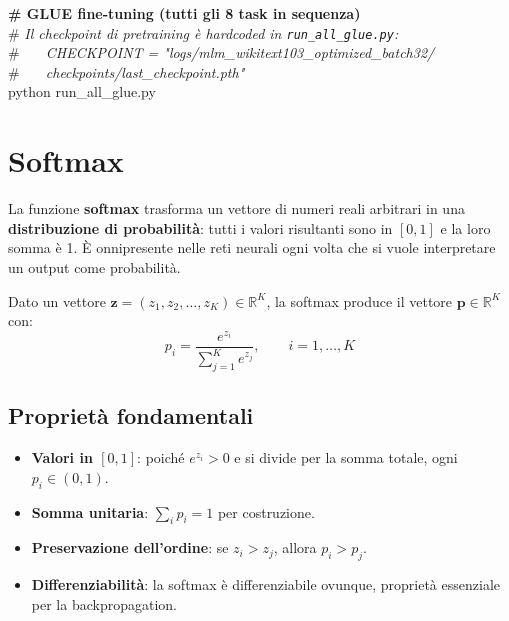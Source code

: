 \documentclass[
  11pt,
]{article}
\begin{document}
\begin{tcolorbox}[colback=gray!5, colframe=gray!40, boxrule=0.5pt, arc=2pt, left=6pt, right=6pt, top=4pt, bottom=4pt, fontupper=\ttfamily\footnotesize]
\textbf{\# GLUE fine-tuning (tutti gli 8 task in sequenza)} \\
\# \emph{Il checkpoint di pretraining \`e hardcoded in \texttt{run\_all\_glue.py}:} \\
\# \emph{\ \ \ CHECKPOINT = "logs/mlm\_wikitext103\_optimized\_batch32/} \\
\# \emph{\ \ \ checkpoints/last\_checkpoint.pth"} \\
python run\_all\_glue.py
\end{tcolorbox}


\appendix

\section{Softmax}
\label{app:softmax}

La funzione \textbf{softmax} trasforma un vettore di numeri reali arbitrari in una \textbf{distribuzione di probabilità}: tutti i valori risultanti sono in $[0,1]$ e la loro somma è 1. È onnipresente nelle reti neurali ogni volta che si vuole interpretare un output come probabilità.

\begin{formulabox}[title={\textbf{Definizione della Softmax}}]
Dato un vettore $\mathbf{z} = (z_1, z_2, \ldots, z_K) \in \mathbb{R}^K$, la softmax produce il vettore $\mathbf{p} \in \mathbb{R}^K$ con:
\[
p_i = \frac{e^{z_i}}{\sum_{j=1}^{K} e^{z_j}}, \qquad i = 1, \ldots, K
\]
\end{formulabox}

\subsection{Proprietà fondamentali}

\begin{itemize}
  \item \textbf{Valori in $[0,1]$}: poiché $e^{z_i} > 0$ e si divide per la somma totale, ogni $p_i \in (0,1)$.
  \item \textbf{Somma unitaria}: $\sum_i p_i = 1$ per costruzione.
  \item \textbf{Preservazione dell'ordine}: se $z_i > z_j$, allora $p_i > p_j$.
  \item \textbf{Differenziabilità}: la softmax è differenziabile ovunque, proprietà essenziale per la backpropagation.
\end{itemize}
\end{document}
